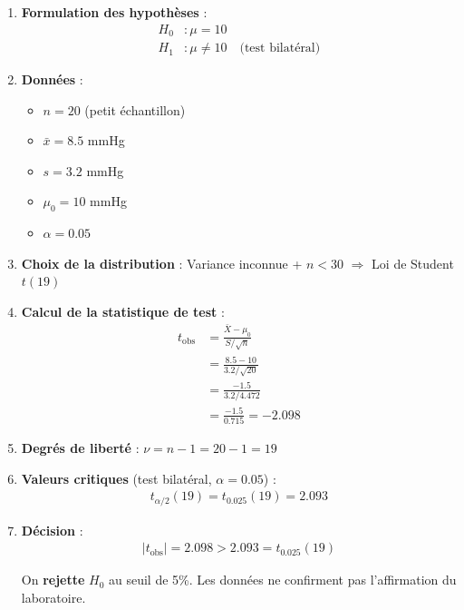 \documentclass[11pt,a4paper]{article}
\begin{document}
\begin{enumerate}
    \item \textbf{Formulation des hypothèses} :
    \begin{align*}
    H_0 &: \mu = 10 \\
    H_1 &: \mu \neq 10 \quad \text{(test bilatéral)}
    \end{align*}
    
    \item \textbf{Données} :
    \begin{itemize}
        \item $n = 20$ (petit échantillon)
        \item $\bar{x} = 8.5$ mmHg
        \item $s = 3.2$ mmHg
        \item $\mu_0 = 10$ mmHg
        \item $\alpha = 0.05$
    \end{itemize}
    
    \item \textbf{Choix de la distribution} : Variance inconnue + $n < 30$ $\Rightarrow$ Loi de Student $t(19)$
    
    \item \textbf{Calcul de la statistique de test} :
    \begin{align*}
    t_{\text{obs}} &= \frac{\bar{X} - \mu_0}{S/\sqrt{n}} \\
    &= \frac{8.5 - 10}{3.2/\sqrt{20}} \\
    &= \frac{-1.5}{3.2/4.472} \\
    &= \frac{-1.5}{0.715} = -2.098
    \end{align*}
    
    \item \textbf{Degrés de liberté} : $\nu = n - 1 = 20 - 1 = 19$
    
    \item \textbf{Valeurs critiques} (test bilatéral, $\alpha = 0.05$) :
    \begin{align*}
    t_{\alpha/2}(19) = t_{0.025}(19) = 2.093
    \end{align*}
    
    \item \textbf{Décision} :
    \begin{align*}
    |t_{\text{obs}}| = 2.098 > 2.093 = t_{0.025}(19)
    \end{align*}
    
    On \textbf{rejette} $H_0$ au seuil de 5\%. Les données ne confirment pas l'affirmation du laboratoire.
    

\end{enumerate}
\end{document}
